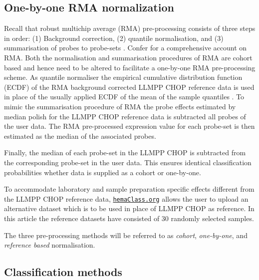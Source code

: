 \documentclass{article}
\newcommand{\hemaClass}{\href{http://hemaClass.org}{\texttt{hemaClass.org}}}
\begin{document}


\subsection{One-by-one RMA normalization}
Recall that robust multichip average (RMA) pre-processing consists of three steps in order:
(1) Background correction,
(2) quantile normalisation, and
(3) summarisation of probes to probe-sets \citep{Irizarry2003}.
Confer \citet{Bolstad2004} for a comprehensive account on RMA.
Both the normalisation and summarisation procedures of RMA are cohort based and hence need to be altered to facilitate a one-by-one RMA pre-processing scheme.
As quantile normaliser the empirical cumulative distribution function (ECDF) of the RMA background corrected LLMPP CHOP reference data is used in place of the usually applied ECDF of the mean of the sample quantiles \citep{Bolstad2003}.
To mimic the summarisation procedure of RMA \citep{Irizarry2003b} the probe effects estimated by median polish for the LLMPP CHOP reference data is subtracted all probes of the user data.
The RMA pre-processed expression value for each probe-set is then estimated as the median of the associated probes.

Finally, the median of each probe-set in the LLMPP CHOP is subtracted from the corresponding probe-set in the user data.
This ensures identical classification probabilities whether data is supplied as a cohort or one-by-one.

To accommodate laboratory and sample preparation specific effects different from the LLMPP CHOP reference data, \hemaClass{} allows the user to upload an alternative dataset which is to be used in place of LLMPP CHOP as reference.
In this article the reference datasets have consisted of $30$ randomly selected samples.

The three pre-processing methods will be referred to as \emph{cohort}, \emph{one-by-one}, and \emph{reference based} normalisation.


\subsection{Classification methods}
\end{document}

